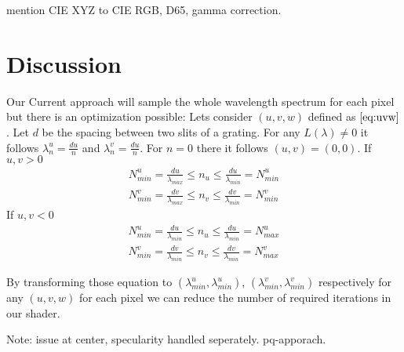 mention CIE XYZ to CIE RGB, D65, gamma correction.

\section{Discussion}
Our Current approach will sample the whole wavelength spectrum for each pixel but there is an optimization possible:
Lets consider $(u,v,w)$ defined as $\ref{eq:uvw}$. Let $d$ be the spacing between two slits of a grating. For any $L(\lambda) \neq 0$ it follows $\lambda_{n}^{u} = \frac{d u}{n}$ and $\lambda_{n}^{v} = \frac{d u}{n}$. For $n = 0$ there it follows $(u,v)=(0,0)$. 
If $u,v > 0$
\begin{align*}
    N_{min}^{u} = \frac{d u}{\lambda_{max}} \leq n_{u} \leq \frac{d u}{\lambda_{min}} = N_{min}^{u}\\
    N_{min}^{v} = \frac{d v}{\lambda_{max}} \leq n_{v} \leq \frac{d v}{\lambda_{min}} = N_{min}^{v}
\end{align*}
If $u,v < 0$
\begin{align*}
    N_{min}^{u} = \frac{d u}{\lambda_{min}} \leq n_{u} \leq \frac{d u}{\lambda_{min}} = N_{max}^{u}\\
    N_{min}^{v} = \frac{d v}{\lambda_{min}} \leq n_{v} \leq \frac{d v}{\lambda_{min}} = N_{max}^{v}
\end{align*}

By transforming those equation to $(\lambda_{min}^{u}, \lambda_{min}^{u})$, $(\lambda_{min}^{v}, \lambda_{min}^{v})$ respectively for any $(u,v,w)$ for each pixel we can reduce the number of required iterations in our shader.

Note: issue at center, specularity handled seperately.
pq-apporach.
